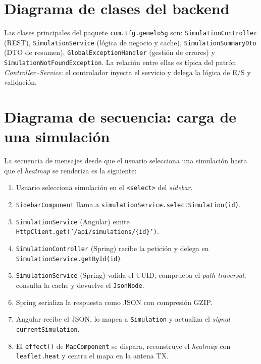 
\section{Diagrama de clases del backend}
\label{sec:uml_clases}

Las clases principales del paquete \texttt{com.tfg.gemelo5g} son:
\texttt{SimulationController} (REST), \texttt{SimulationService} (lógica de
negocio y cache), \texttt{SimulationSummaryDto} (DTO de resumen),
\texttt{GlobalExceptionHandler} (gestión de errores) y
\texttt{SimulationNotFoundException}. La relación entre ellas es típica del
patrón \emph{Controller--Service}: el controlador inyecta el servicio y delega
la lógica de E/S y validación.

\section{Diagrama de secuencia: carga de una simulación}
\label{sec:uml_secuencia}

La secuencia de mensajes desde que el usuario selecciona una simulación hasta
que el \textit{heatmap} se renderiza es la siguiente:

\begin{enumerate}
\item Usuario selecciona simulación en el \texttt{<select>} del \textit{sidebar}.
\item \texttt{SidebarComponent} llama a
  \texttt{simulationService.selectSimulation(id)}.
\item \texttt{SimulationService} (Angular) emite \texttt{HttpClient.get('/api/simulations/\{id\}')}.
\item \texttt{SimulationController} (Spring) recibe la petición y delega en
  \texttt{SimulationService.getById(id)}.
\item \texttt{SimulationService} (Spring) valida el UUID, comprueba el
  \textit{path traversal}, consulta la cache y devuelve el \texttt{JsonNode}.
\item Spring serializa la respuesta como JSON con compresión GZIP.
\item Angular recibe el JSON, lo mapea a \texttt{Simulation} y actualiza el
  \textit{signal} \texttt{currentSimulation}.
\item El \texttt{effect()} de \texttt{MapComponent} se dispara, reconstruye el
  \textit{heatmap} con \texttt{leaflet.heat} y centra el mapa en la antena TX.
\end{enumerate}

